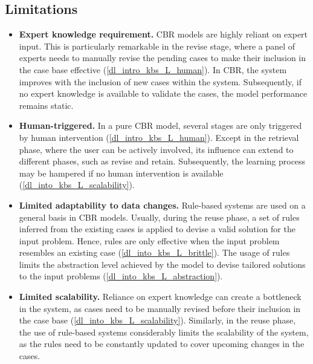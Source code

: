 \subsection{Limitations}
\begin{itemize}
    \item \textbf{Expert knowledge requirement.} CBR models are highly reliant on expert input. This is particularly remarkable in the revise stage, where a panel of experts needs to manually revise the pending cases to make their inclusion in the case base effective (\ref{dl_intro_kbs_L_human}). In CBR, the system improves with the inclusion of new cases within the system. Subsequently, if no expert knowledge is available to validate the cases, the model performance remains static. 
    
    \item \textbf{Human-triggered.} In a pure CBR model, several stages are only triggered by human intervention (\ref{dl_intro_kbs_L_human}). Except in the retrieval phase, where the user can be actively involved, its influence can extend to different phases, such as revise and retain. Subsequently, the learning process may be hampered if no human intervention is available (\ref{dl_into_kbs_L_scalability}).
    
    \item \textbf{Limited adaptability to data changes.} Rule-based systems are used on a general basis in CBR models. Usually, during the reuse phase, a set of rules inferred from the existing cases is applied to devise a valid solution for the input problem. Hence, rules are only effective when the input problem resembles an existing case (\ref{dl_into_kbs_L_brittle}). The usage of rules limits the abstraction level achieved by the model to devise tailored solutions to the input problems (\ref{dl_into_kbs_L_abstraction}).
    
    \item \textbf{Limited scalability.} Reliance on expert knowledge can create a bottleneck in the system, as cases need to be manually revised before their inclusion in the case base (\ref{dl_into_kbs_L_scalability}). Similarly, in the reuse phase, the use of rule-based systems considerably limits the scalability of the system, as the rules need to be constantly updated to cover upcoming changes in the cases.
    
    
\end{itemize}
